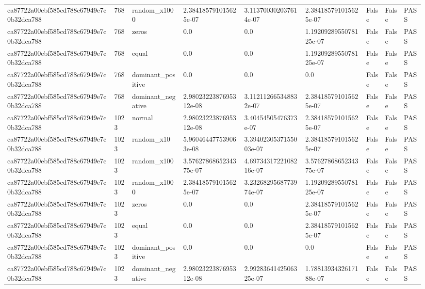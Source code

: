 \begin{tabular}{lllllllll}
ca87722a00ebf585cd788c67949e7c0b32dca788 & 768 & random\_x1000 & 2.384185791015625e-07 & 3.113700302037614e-07 & 2.384185791015625e-07 & False & False & PASS \\
ca87722a00ebf585cd788c67949e7c0b32dca788 & 768 & zeros & 0.0 & 0.0 & 1.1920928955078125e-07 & False & False & PASS \\
ca87722a00ebf585cd788c67949e7c0b32dca788 & 768 & equal & 0.0 & 0.0 & 1.1920928955078125e-07 & False & False & PASS \\
ca87722a00ebf585cd788c67949e7c0b32dca788 & 768 & dominant\_positive & 0.0 & 0.0 & 0.0 & False & False & PASS \\
ca87722a00ebf585cd788c67949e7c0b32dca788 & 768 & dominant\_negative & 2.9802322387695312e-08 & 3.112112665348832e-07 & 2.384185791015625e-07 & False & False & PASS \\
ca87722a00ebf585cd788c67949e7c0b32dca788 & 1023 & normal & 2.9802322387695312e-08 & 3.40454505476373e-07 & 2.384185791015625e-07 & False & False & PASS \\
ca87722a00ebf585cd788c67949e7c0b32dca788 & 1023 & random\_x10 & 5.960464477539063e-08 & 3.3940230537155003e-07 & 2.384185791015625e-07 & False & False & PASS \\
ca87722a00ebf585cd788c67949e7c0b32dca788 & 1023 & random\_x100 & 3.5762786865234375e-07 & 4.6973431722108216e-07 & 3.5762786865234375e-07 & False & False & PASS \\
ca87722a00ebf585cd788c67949e7c0b32dca788 & 1023 & random\_x1000 & 2.384185791015625e-07 & 3.2326829568773974e-07 & 1.1920928955078125e-07 & False & False & PASS \\
ca87722a00ebf585cd788c67949e7c0b32dca788 & 1023 & zeros & 0.0 & 0.0 & 2.384185791015625e-07 & False & False & PASS \\
ca87722a00ebf585cd788c67949e7c0b32dca788 & 1023 & equal & 0.0 & 0.0 & 2.384185791015625e-07 & False & False & PASS \\
ca87722a00ebf585cd788c67949e7c0b32dca788 & 1023 & dominant\_positive & 0.0 & 0.0 & 0.0 & False & False & PASS \\
ca87722a00ebf585cd788c67949e7c0b32dca788 & 1023 & dominant\_negative & 2.9802322387695312e-08 & 2.9928364142506325e-07 & 1.7881393432617188e-07 & False & False & PASS \\
\hline
\end{tabular}
